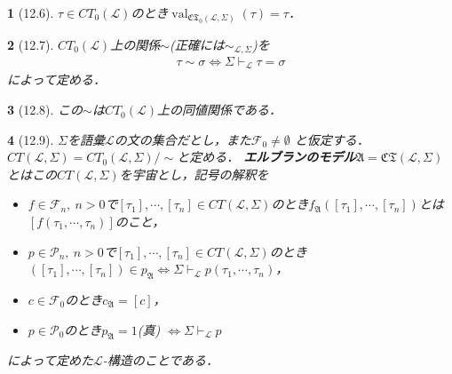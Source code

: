 \documentclass[a4j,10.5pt,oneside,openany]{jsbook}
\theoremstyle{mystyle}
\newtheorem{thm}{\color{DarkMidnightBlue}{定理}}[section]
\newtheorem{dfn}[thm]{\color{PakistanGreen}{定義}}
\newcommand{\val}{\operatorname{val}} %
\begin{document}
	\begin{screen}
		\begin{thm}[12.6]
			$\tau \in CT_{0}(\mathcal{L})$のとき$\val_{\mathfrak{CT}_{0}(\mathcal{L},\Sigma)}(\tau) = \tau$．
		\end{thm}
	\end{screen}
	
	\begin{screen}
		\begin{dfn}[12.7]
			$CT_{0}(\mathcal{L})$上の関係$\sim$(正確には$\sim_{\mathcal{L},\Sigma}$)を
			\begin{align}
				\tau \sim \sigma \Longleftrightarrow \Sigma \vdash_{\mathcal{L}}
				\tau = \sigma
			\end{align}
			によって定める．
		\end{dfn}
	\end{screen}
	
	\begin{screen}
		\begin{thm}[12.8]
			この$\sim$は$CT_{0}(\mathcal{L})$上の同値関係である．
		\end{thm}
	\end{screen}
	
	\begin{screen}
		\begin{dfn}[12.9]
			$\Sigma$を語彙$\mathcal{L}$の文の集合だとし，また$\mathcal{F}_{0} \neq \emptyset$
			と仮定する．$CT(\mathcal{L},\Sigma) = CT_{0}(\mathcal{L},\Sigma)/\sim$と定める．
			{\bf エルブランのモデル}$\mathfrak{A} = \mathfrak{CT}(\mathcal{L},\Sigma)$
			とはこの$CT(\mathcal{L},\Sigma)$を宇宙とし，記号の解釈を
			\begin{itemize}
				\item $f \in \mathcal{F}_{n},\ n > 0$で$[\tau_{1}],\cdots,[\tau_{n}]
					\in CT(\mathcal{L},\Sigma)$のとき$f_{\mathfrak{A}}\left([\tau_{1}],
					\cdots,[\tau_{n}]\right)$とは$\left[f(\tau_{1},\cdots,\tau_{n})\right]$のこと，
					
				\item $p \in \mathcal{P}_{n},\ n > 0$で$[\tau_{1}],\cdots,[\tau_{n}]
					\in CT(\mathcal{L},\Sigma)$のとき$\left([\tau_{1}],\cdots,
					[\tau_{n}]\right) \in p_{\mathfrak{A}} \Longleftrightarrow
					\Sigma \vdash_{\mathcal{L}} p(\tau_{1},\cdots,\tau_{n})$，
					
				\item $c \in \mathcal{F}_{0}$のとき$c_{\mathfrak{A}} = [c]$，
				\item $p \in \mathcal{P}_{0}$のとき$p_{\mathfrak{A}} = 1$(真)
					$\Longleftrightarrow \Sigma \vdash_{\mathcal{L}} p$
			\end{itemize}
			によって定めた$\mathcal{L}$-構造のことである．
		\end{dfn}	
	\end{screen}
	
\end{document}
